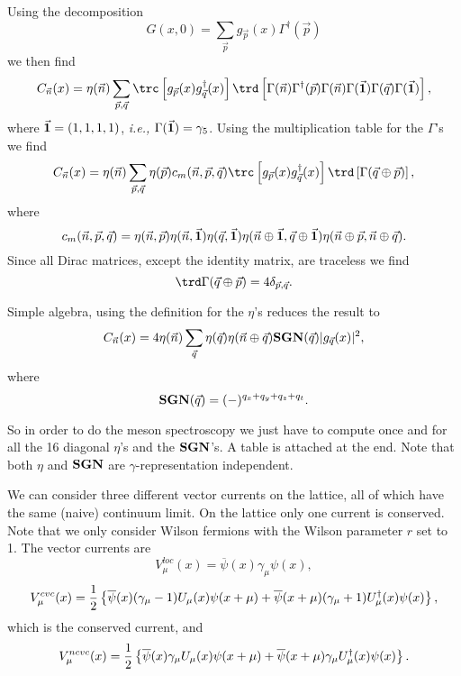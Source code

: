 Using the decomposition
$$ G(x,0) = \sum_{\vec p} g_{\vec p}(x) \Gamma^\dagger(\vec p)$$
we then find
$$ C_{\vec n} (x) = \eta(\vec n) \sum_{\vec p,\vec q} \trc \left[ 
 g_{\vec p}(x)  g_{\vec q}^\dagger(x) \right] \trd \left[ \Gamma(\vec n) 
 \Gamma^\dagger(\vec p)  \Gamma(\vec n)  \Gamma(\vec {\bf 1}) 
 \Gamma(\vec q) \Gamma(\vec {\bf 1}) \right], $$
where $\vec {\bf 1} = (1,1,1,1)$, {\it i.e.,} $\Gamma(\vec {\bf 1}) =
\gamma_5$. Using the multiplication table for the $\Gamma$'s we find
$$ C_{\vec n} (x) = \eta(\vec n) \sum_{\vec p,\vec q} \eta(\vec p) 
 c_m(\vec n, \vec p, \vec q) \trc \left[ g_{\vec p}(x) g_{\vec q}^\dagger(x) 
 \right] \trd \left[ \Gamma(\vec q\oplus\vec p) \right], $$
where 
$$ c_m(\vec n, \vec p, \vec q) = \eta(\vec n,\vec p) \eta(\vec n,
 \vec {\bf 1}) \eta(\vec q, \vec {\bf 1}) \eta(\vec n \oplus \vec {\bf 1},
 \vec q \oplus \vec {\bf 1}) \eta(\vec n \oplus \vec p, 
 \vec n \oplus \vec q). $$
Since all Dirac matrices, except the identity matrix, are traceless we find
$$ \trd \Gamma(\vec q\oplus \vec p) = 4 \delta_{ \vec p, \vec q}. $$ 

Simple algebra, using the definition for the $\eta$'s reduces the
result to
$$ C_{\vec n} (x) = 4 \eta(\vec n) \sum_{\vec q} \eta(\vec q) 
 \eta(\vec n \oplus \vec q) {\bf SGN}(\vec q) |g_{\vec q}(x)|^2, $$
where
$$ {\bf SGN}(\vec q) = (-)^{q_x + q_y + q_z + q_t}. $$

So in order to do the meson spectroscopy we just have to compute once and 
for all the 16 diagonal $\eta$'s and the ${\bf SGN}$'s. A table is attached
at the end. Note that both $\eta$ and ${\bf SGN}$ are 
$\gamma$-representation independent.

\bigskip

\medskip

We can consider three different vector currents on the lattice, all of
which have the same (naive) continuum limit. On the lattice only one 
current is conserved. Note that we only consider Wilson fermions with the 
Wilson parameter $r$ set to 1. The vector currents are
$$ V^{loc}_{\mu} (x) = \overline \psi(x) \gamma_{\mu} \psi(x), $$
$$ V^{cvc}_{\mu} (x) = {1 \over 2} \left\{ \overline \psi(x) 
 (\gamma_{\mu} - 1) U_{\mu}(x) \psi(x+\mu) + \overline \psi(x+\mu) 
 (\gamma_{\mu} + 1) U^\dagger_{\mu}(x) \psi(x) \right\}, $$
which is the conserved current, and
$$ V^{ncvc}_{\mu} (x) = {1 \over 2} \left\{ \overline \psi(x) 
 \gamma_{\mu} U_{\mu}(x) \psi(x+\mu) + \overline \psi(x+\mu) 
 \gamma_{\mu} U^\dagger_{\mu}(x) \psi(x) \right\}. $$

